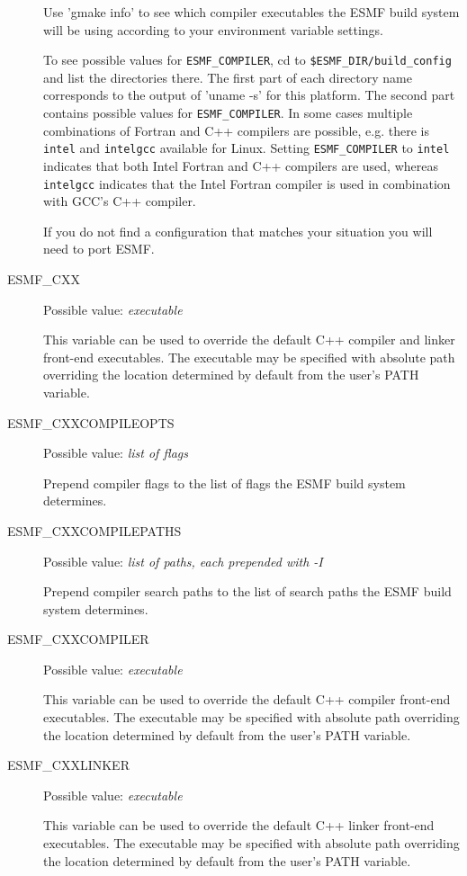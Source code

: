 \begin{description}
Use 'gmake info' to see which compiler executables the ESMF build system will
be using according to your environment variable settings.

To see possible values for {\tt ESMF\_COMPILER}, cd to 
{\tt \$ESMF\_DIR/build\_config} and list the directories there. The first part 
of each directory name corresponds to the output of 'uname -s' for this 
platform. The second part contains possible values for {\tt ESMF\_COMPILER}. In
some cases multiple combinations of Fortran and C++ compilers are possible, e.g.
there is {\tt intel} and {\tt intelgcc} available for Linux. Setting 
{\tt ESMF\_COMPILER} to {\tt intel} indicates that both Intel Fortran and 
C++ compilers are used, whereas {\tt intelgcc} indicates that the Intel Fortran
compiler is used in combination with GCC's C++ compiler.

If you do not find a configuration that matches your situation you will need to
port ESMF.

\item[ESMF\_CXX]
Possible value: {\em executable}

This variable can be used to override the default C++ compiler and linker
front-end executables. The executable may be specified with absolute path
overriding the location determined by default from the user's PATH variable.

\item[ESMF\_CXXCOMPILEOPTS]
Possible value: {\em list of flags}

Prepend compiler flags to the list of flags the ESMF build system determines.

\item[ESMF\_CXXCOMPILEPATHS]
Possible value: {\em list of paths, each prepended with -I}

Prepend compiler search paths to the list of search paths the ESMF build system
determines.

\item[ESMF\_CXXCOMPILER]
Possible value: {\em executable}

This variable can be used to override the default C++ compiler
front-end executables. The executable may be specified with absolute path
overriding the location determined by default from the user's PATH variable.

\item[ESMF\_CXXLINKER]
Possible value: {\em executable}

This variable can be used to override the default C++ linker
front-end executables. The executable may be specified with absolute path
overriding the location determined by default from the user's PATH variable.


\end{description}
